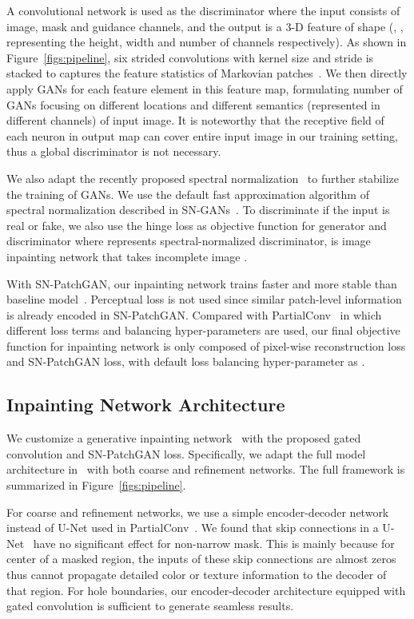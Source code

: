 \documentclass[10pt,twocolumn,letterpaper]{article}
\begin{document}
A convolutional network is used as the discriminator where the input consists of image, mask and guidance channels, and the output is a 3-D feature of shape  (, ,  representing the height, width and number of channels respectively). As shown in Figure~\ref{figs:pipeline}, six strided convolutions with kernel size  and stride  is stacked to captures the feature statistics of Markovian patches~\cite{li2016precomputed}. We then directly apply GANs for each feature element in this feature map, formulating  number of GANs focusing on different locations and different semantics (represented in different channels) of input image. It is noteworthy that the receptive field of each neuron in output map can cover entire input image in our training setting, thus a global discriminator is not necessary.

We also adapt the recently proposed spectral normalization~\cite{miyato2018spectral} to further stabilize the training of GANs. We use the default fast approximation algorithm of spectral normalization described in SN-GANs~\cite{miyato2018spectral}. To discriminate if the input is real or fake, we also use the hinge loss as objective function for generator  and discriminator  where  represents spectral-normalized discriminator,  is image inpainting network that takes incomplete image .

With SN-PatchGAN, our inpainting network trains faster and more stable than baseline model~\cite{yu2018generative}. Perceptual loss is not used since similar patch-level information is already encoded in SN-PatchGAN. Compared with PartialConv~\cite{liu2018image} in which  different loss terms and balancing hyper-parameters are used, our final objective function for inpainting network is only composed of pixel-wise  reconstruction loss and SN-PatchGAN loss, with default loss balancing hyper-parameter as .


\subsection{Inpainting Network Architecture}
We customize a generative inpainting network~\cite{yu2018generative} with the proposed gated convolution and SN-PatchGAN loss. Specifically, we adapt the full model architecture in~\cite{yu2018generative} with both coarse and refinement networks. The full framework is summarized in Figure~\ref{figs:pipeline}.

For coarse and refinement networks, we use a simple encoder-decoder network~\cite{yu2018generative} instead of U-Net used in PartialConv~\cite{liu2018image}. We found that skip connections in a U-Net~\cite{ronneberger2015u} have no significant effect for non-narrow mask. This is mainly because for center of a masked region, the inputs of these skip connections are almost zeros thus cannot propagate detailed color or texture information to the decoder of that region. For hole boundaries, our encoder-decoder architecture equipped with gated convolution is sufficient to generate seamless results.
\end{document}
